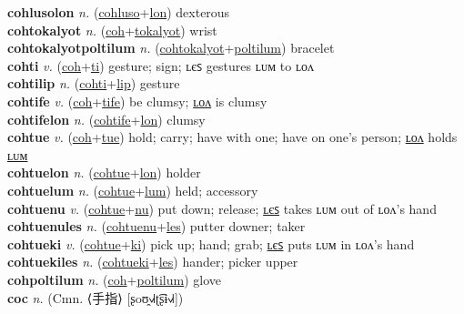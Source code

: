 \textbf{cohlusolon} \textit{n.} (\hyperref[cohluso]{cohluso}+\hyperref[lon]{lon})
dexterous \label{cohlusolon} \\
\textbf{cohtokalyot} \textit{n.} (\hyperref[coh]{coh}+\hyperref[tokalyot]{tokalyot})
wrist \label{cohtokalyot} \\
\textbf{cohtokalyotpoltilum} \textit{n.} (\hyperref[cohtokalyot]{cohtokalyot}+\hyperref[poltilum]{poltilum})
bracelet \label{cohtokalyotpoltilum} \\
\textbf{cohti} \textit{v.} (\hyperref[coh]{coh}+\hyperref[ti]{ti})
gesture; sign; ʟєꜱ gestures ʟᴜᴍ to ʟᴏᴧ \label{cohti} \\
\textbf{cohtilip} \textit{n.} (\hyperref[cohti]{cohti}+\hyperref[lip]{lip})
gesture \label{cohtilip} \\
\textbf{cohtife} \textit{v.} (\hyperref[coh]{coh}+\hyperref[tife]{tife})
be clumsy; \hyperref[cohtifelon]{ʟᴏᴧ} is clumsy \label{cohtife} \\
\textbf{cohtifelon} \textit{n.} (\hyperref[cohtife]{cohtife}+\hyperref[lon]{lon})
clumsy \label{cohtifelon} \\
\textbf{cohtue} \textit{v.} (\hyperref[coh]{coh}+\hyperref[tue]{tue})
hold; carry; have with one; have on one’s person; \hyperref[cohtuelon]{ʟᴏᴧ} holds \hyperref[cohtuelum]{ʟᴜᴍ} \label{cohtue} \\
\textbf{cohtuelon} \textit{n.} (\hyperref[cohtue]{cohtue}+\hyperref[lon]{lon})
holder \label{cohtuelon} \\
\textbf{cohtuelum} \textit{n.} (\hyperref[cohtue]{cohtue}+\hyperref[lum]{lum})
held; accessory \label{cohtuelum} \\
\textbf{cohtuenu} \textit{v.} (\hyperref[cohtue]{cohtue}+\hyperref[nu]{nu})
put down; release; \hyperref[cohtuenules]{ʟєꜱ} takes ʟᴜᴍ out of ʟᴏᴧ’s hand \label{cohtuenu} \\
\textbf{cohtuenules} \textit{n.} (\hyperref[cohtuenu]{cohtuenu}+\hyperref[les]{les})
putter downer; taker \label{cohtuenules} \\
\textbf{cohtueki} \textit{v.} (\hyperref[cohtue]{cohtue}+\hyperref[ki]{ki})
pick up; hand; grab; \hyperref[cohtuekiles]{ʟєꜱ} puts ʟᴜᴍ in ʟᴏᴧ’s hand \label{cohtueki} \\
\textbf{cohtuekiles} \textit{n.} (\hyperref[cohtueki]{cohtueki}+\hyperref[les]{les})
hander; picker upper \label{cohtuekiles} \\
\textbf{cohpoltilum} \textit{n.} (\hyperref[coh]{coh}+\hyperref[poltilum]{poltilum})
glove \label{cohpoltilum} \\
\textbf{coc} \textit{n.} (Cmn. ⟨手指⟩ [ʂoʊ̯˧˩˧ʈ͡ʂɨ˧˩˧])

